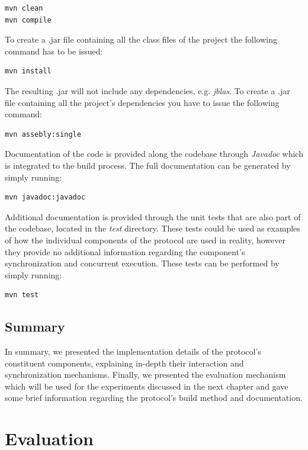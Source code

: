 \documentclass[a4paper,11pt,twoside]{report}
\begin{document}
\begin{verbatim}
mvn clean
mvn compile
\end{verbatim}

\noindent To create a .jar file containing all the class files of the project the following command has to be issued:

\begin{verbatim}
mvn install
\end{verbatim}

\noindent The resulting .jar will not include any dependencies, e.g. \textit{jblas}. To create a .jar file containing all the project's dependencies you have to issue the following command:

\begin{verbatim}
mvn assebly:single
\end{verbatim}

Documentation of the code is provided along the codebase through \textit{Javadoc} which is integrated to the build process. The full documentation can be generated by simply running:

\begin{verbatim}
mvn javadoc:javadoc
\end{verbatim}

\noindent Additional documentation is provided through the unit tests that are also part of the codebase, located in the \textit{test} directory. These tests could be used as examples of how the individual components of the protocol are used in reality, however they provide no additional information regarding the component's synchronization and concurrent execution. These tests can be performed by simply running:

\begin{verbatim}
mvn test
\end{verbatim}

\section{Summary}

In summary, we presented the implementation details of the protocol's constituent components, explaining in-depth their interaction and synchronization mechanisms. Finally, we presented the evaluation mechanism which will be used for the experiments discussed in the next chapter and gave some brief information regarding the protocol's build method and documentation.

\chapter{Evaluation}
\label{sec:evaluation}
\end{document}
